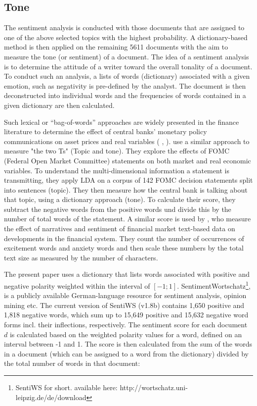 \documentclass[12pt,a4paper,notitlepage]{article}
\begin{document}
\subsection{Tone}\label{subsection_tone}

The sentiment analysis is conducted with those documents that are assigned to one of the above selected topics with the highest probability. A dictionary-based method is then applied on the remaining 5611 documents with the aim to measure the tone (or sentiment) of a document. The idea of a sentiment analysis is to determine the attitude of a writer toward the overall tonality of a document. To conduct such an analysis, a lists of words (dictionary) associated with a given emotion, such as negativity is pre-defined by the analyst. The document is then deconstructed into individual words and the frequencies of words contained in a given dictionary are then calculated. 

Such lexical or “bag-of-words” approaches are widely presented in the finance literature to  determine  the  effect  of  central  banks’  monetary  policy  communications on asset prices and real variables (\citet{nyman_news_2018} \citep{tetlock_giving_2007}, \citep{tetlock_more_2008}). \citet{hansen_shocking_2016} use a similar approach to measure "the two Ts" (Topic and tone). They explore the effects of FOMC (Federal Open Market Committee) statements on both market and real economic variables. To understand the multi-dimensional information a statement is transmitting, they apply LDA on a corpus of 142 FOMC decision statements split into sentences (topic). They then measure how the central bank is talking about that topic, using a dictionary approach (tone). To calculate their score, they subtract the negative words from the positive words und divide this by the number of total words of the statement. A similar score is used by \citet{nyman_news_2018}, who measure the effect of narratives and sentiment of financial market text-based data on developments in the financial system. They count the number of occurrences of excitement words and anxiety words and then scale these numbers by the total text size as measured by the number of characters.

The present paper uses a dictionary that lists words associated with positive and negative polarity weighted within the interval of $[-1; 1]$. SentimentWortschatz\footnote{SentiWS for short. available here: http://wortschatz.uni-leipzig.de/de/download}, is a publicly available German-language resource for sentiment analysis, opinion mining etc. The current version of SentiWS (v1.8b) contains 1,650 positive and 1,818 negative words, which sum up to 15,649 positive and 15,632 negative word forms incl. their inflections, respectively. The sentiment score for each document $d$ is calculated  based on the weighted polarity values for a word, defined on an interval between -1 and 1. The score is then calculated from the sum of the words in a document (which can be assigned to a word from the dictionary) divided by the total number of words in that document:
 
\end{document}
